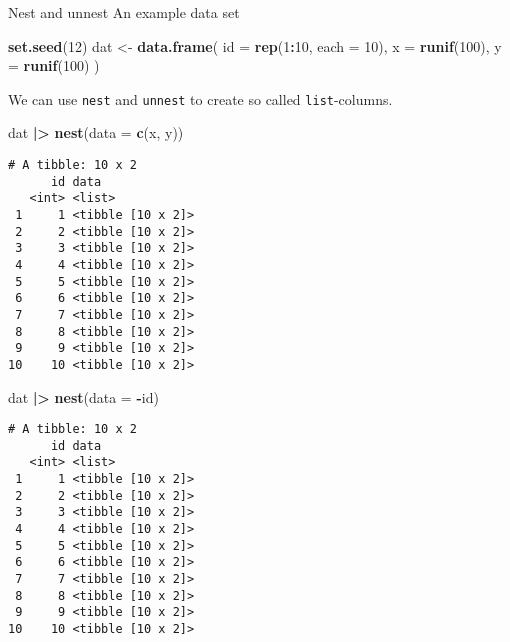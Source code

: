 \documentclass[ignorenonframetext,,t]{beamer}
\let\oldtextbf\textbf
\renewcommand{\textbf}[1]{\textcolor{spamwell}{\oldtextbf{#1}}}
\newenvironment{Shaded}{\begin{snugshade}}{\end{snugshade}}
\newcommand{\AttributeTok}[1]{\textcolor[rgb]{0.13,0.29,0.53}{#1}}
\newcommand{\DecValTok}[1]{\textcolor[rgb]{0.00,0.00,0.81}{#1}}
\newcommand{\FunctionTok}[1]{\textcolor[rgb]{0.13,0.29,0.53}{\textbf{#1}}}
\newcommand{\NormalTok}[1]{#1}
\newcommand{\OtherTok}[1]{\textcolor[rgb]{0.56,0.35,0.01}{#1}}
\newcommand{\SpecialCharTok}[1]{\textcolor[rgb]{0.81,0.36,0.00}{\textbf{#1}}}
\begin{document}
\begin{frame}[fragile]{Nest and unnest}
\protect\hypertarget{nest-and-unnest}{}
An example data set

\begin{Shaded}
\begin{Highlighting}[]
\FunctionTok{set.seed}\NormalTok{(}\DecValTok{12}\NormalTok{)}
\NormalTok{dat }\OtherTok{\textless{}{-}} \FunctionTok{data.frame}\NormalTok{(}
  \AttributeTok{id =} \FunctionTok{rep}\NormalTok{(}\DecValTok{1}\SpecialCharTok{:}\DecValTok{10}\NormalTok{, }\AttributeTok{each =} \DecValTok{10}\NormalTok{), }
  \AttributeTok{x =} \FunctionTok{runif}\NormalTok{(}\DecValTok{100}\NormalTok{), }
  \AttributeTok{y =} \FunctionTok{runif}\NormalTok{(}\DecValTok{100}\NormalTok{)}
\NormalTok{)}
\end{Highlighting}
\end{Shaded}
\end{frame}

\begin{frame}[fragile]
We can use \texttt{nest} and \texttt{unnest} to create so called
\texttt{list}-columns.

\begin{Shaded}
\begin{Highlighting}[]
\NormalTok{dat }\SpecialCharTok{|\textgreater{}} \FunctionTok{nest}\NormalTok{(}\AttributeTok{data =} \FunctionTok{c}\NormalTok{(x, y))}
\end{Highlighting}
\end{Shaded}

\begin{verbatim}
# A tibble: 10 x 2
      id data             
   <int> <list>           
 1     1 <tibble [10 x 2]>
 2     2 <tibble [10 x 2]>
 3     3 <tibble [10 x 2]>
 4     4 <tibble [10 x 2]>
 5     5 <tibble [10 x 2]>
 6     6 <tibble [10 x 2]>
 7     7 <tibble [10 x 2]>
 8     8 <tibble [10 x 2]>
 9     9 <tibble [10 x 2]>
10    10 <tibble [10 x 2]>
\end{verbatim}
\end{frame}

\begin{frame}[fragile]
\begin{Shaded}
\begin{Highlighting}[]
\NormalTok{dat }\SpecialCharTok{|\textgreater{}} \FunctionTok{nest}\NormalTok{(}\AttributeTok{data =} \SpecialCharTok{{-}}\NormalTok{id)}
\end{Highlighting}
\end{Shaded}

\begin{verbatim}
# A tibble: 10 x 2
      id data             
   <int> <list>           
 1     1 <tibble [10 x 2]>
 2     2 <tibble [10 x 2]>
 3     3 <tibble [10 x 2]>
 4     4 <tibble [10 x 2]>
 5     5 <tibble [10 x 2]>
 6     6 <tibble [10 x 2]>
 7     7 <tibble [10 x 2]>
 8     8 <tibble [10 x 2]>
 9     9 <tibble [10 x 2]>
10    10 <tibble [10 x 2]>
\end{verbatim}
\end{frame}
\end{document}
